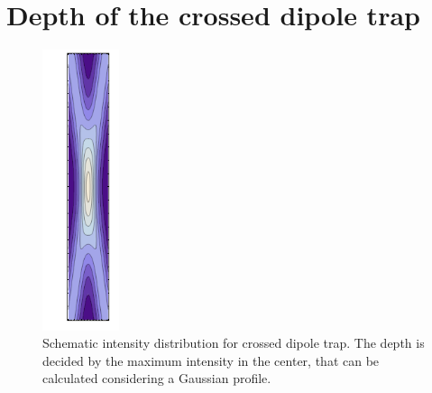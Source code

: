 \section{Depth of the crossed dipole trap}
\begin{figure}[H]
\centering
 \includegraphics[width=0.2\textwidth,angle=90]{crossed_dipole_trap}

\caption{Schematic intensity distribution for crossed dipole trap. The depth is decided by the maximum intensity in the center, that can be calculated considering a Gaussian profile.}
\label{dipolegraphic}
\end{figure}

